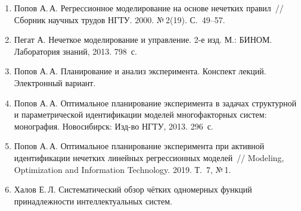 \documentclass[a4paper,12pt]{article}
\begin{document}
\begin{enumerate}
\item Попов А.\,А. Регрессионное моделирование на основе нечетких правил~//
      Сборник научных трудов НГТУ. 2000. №\,2(19). С.~49--57.
\item Пегат А. Нечеткое моделирование и управление. 2-е изд. М.:
      БИНОМ. Лаборатория знаний, 2013. 798~с.
\item Попов А.\,А. Планирование и анализ эксперимента. Конспект лекций.
      Электронный вариант.
\item Попов А.\,А. Оптимальное планирование эксперимента в задачах структурной
      и параметрической идентификации моделей многофакторных систем:
      монография. Новосибирск: Изд-во НГТУ, 2013. 296~с.
\item Попов А.\,А. Оптимальное планирование эксперимента при активной
      идентификации нечетких линейных регрессионных моделей~//
      Modeling, Optimization and Information Technology. 2019. Т.~7, №\,1.
\item Халов Е.\,Л. Систематический обзор чётких одномерных функций
      принадлежности интеллектуальных систем.
\end{enumerate}
\end{document}
